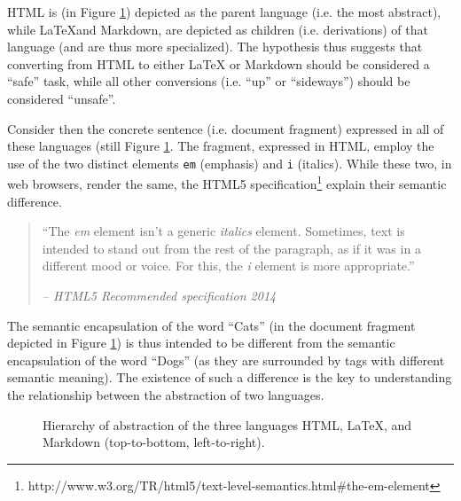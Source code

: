 \documentclass{scrreprt}
\begin{document}
HTML is (in Figure \ref{fig:hierarchy-of-abstraction-example-tree}) depicted as the parent language (i.e. the most abstract), while \LaTeX and Markdown, are depicted as children (i.e. derivations) of that language (and are thus more specialized). The hypothesis thus suggests that converting from HTML to either \LaTeX{} or Markdown should be considered a ``safe'' task, while all other conversions (i.e. ``up'' or ``sideways'') should be considered ``unsafe''.

Consider then the concrete sentence (i.e. document fragment) expressed in all of these languages (still Figure \ref{fig:hierarchy-of-abstraction-example-tree}. The fragment, expressed in HTML, employ the use of the two distinct elements \texttt{em} (emphasis) and \texttt{i} (italics). While these two, in web browsers, render the same, the HTML5 specification\footnote{http://www.w3.org/TR/html5/text-level-semantics.html\#the-em-element} explain their semantic difference.

\begin{quote}
``The \emph{em} element isn't a generic \emph{italics} element. Sometimes, text is intended to stand out from the rest of the paragraph, as if it was in a different mood or voice. For this, the \emph{i} element is more appropriate.''
\begin{flushright}
\textit{-- HTML5 Recommended specification 2014}
\end{flushright}
\end{quote}

The semantic encapsulation of the word ``Cats'' (in the document fragment depicted in Figure \ref{fig:hierarchy-of-abstraction-example-tree}) is thus intended to be different from the semantic encapsulation of the word ``Dogs'' (as they are surrounded by tags with different semantic meaning). The existence of such a difference is the key to understanding the relationship between the abstraction of two languages.

\begin{figure}[h]
  \centering

  \caption{Hierarchy of abstraction of the three languages HTML, \LaTeX, and Markdown (top-to-bottom, left-to-right).}
  \label{fig:hierarchy-of-abstraction-example-tree}
\end{figure}
\end{document}
